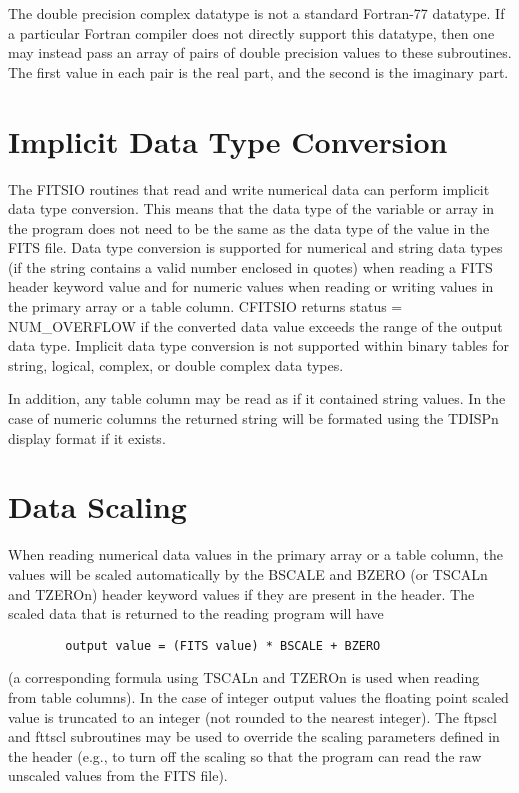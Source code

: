 \documentclass[11pt]{book}
\begin{document}
The double precision complex datatype is not a standard Fortran-77
datatype.  If a particular Fortran compiler does not directly support
this datatype,  then one may instead pass an array of pairs of double
precision values to these subroutines.  The first  value in each pair
is the real part, and the second is the imaginary part.


\section{Implicit Data Type Conversion}

The FITSIO routines that read and write numerical data can perform
implicit data type conversion.  This means that the data type of the
variable or array in the program does not need to be the same as the
data type of the value in the FITS file.  Data type conversion is
supported for numerical and string data types (if the string contains a
valid number enclosed in quotes) when reading a FITS header keyword
value and for numeric values when reading or writing values in the
primary array or a table column.  CFITSIO returns status =
NUM\_OVERFLOW  if the converted data value exceeds the range of the
output data type.  Implicit data type conversion is not supported
within binary tables for string, logical, complex, or double complex
data types.

In addition, any table column may be read as if it contained string values.
In the case of numeric columns the returned string will be formated
using the TDISPn display format if it exists.


\section{Data Scaling}

When reading numerical data values in the primary array or a
table column, the values will be scaled automatically by the BSCALE and
BZERO (or TSCALn and TZEROn) header keyword values if they are
present in the header.  The scaled data that is returned to the reading
program will have

\begin{verbatim}
        output value = (FITS value) * BSCALE + BZERO
\end{verbatim}
(a corresponding formula using TSCALn and TZEROn is used when reading
from table columns).  In the case of integer output values the floating
point scaled value is truncated to an integer (not rounded to the
nearest integer).  The ftpscl and fttscl subroutines may be used to
override the scaling parameters defined in the header (e.g., to turn
off the scaling so that the program can read the raw unscaled values
from the FITS file).
\end{document}
